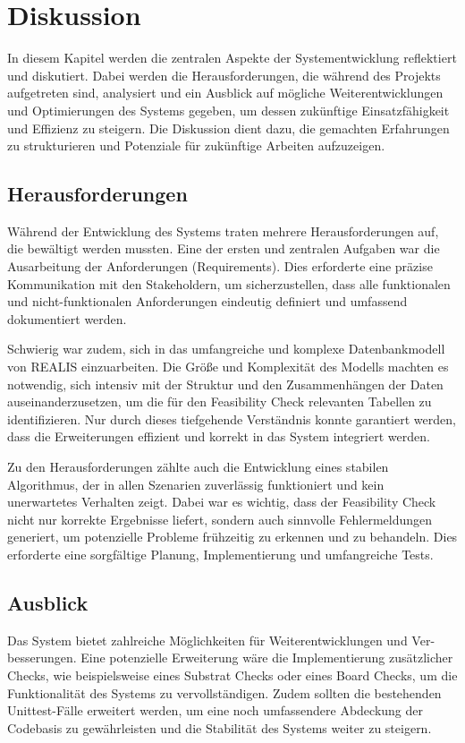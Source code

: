 \chapter{Diskussion}
In diesem Kapitel werden die zentralen Aspekte der Systementwicklung reflektiert und diskutiert. Dabei werden die Herausforderungen, die während des Projekts aufgetreten sind, analysiert und ein Ausblick auf mögliche Weiterentwicklungen und Optimierungen des Systems gegeben, um dessen zukünftige Einsatzfähigkeit und Effizienz zu steigern. Die Diskussion dient dazu, die gemachten Erfahrungen zu strukturieren und Potenziale für zukünftige Arbeiten aufzuzeigen.
\section{Herausforderungen}

Während der Entwicklung des Systems traten mehrere Herausforderungen auf, die bewältigt werden mussten. Eine der ersten und zentralen Aufgaben war die Ausarbeitung der Anforderungen (Requirements). Dies erforderte eine präzise Kommunikation mit den Stakeholdern, um sicherzustellen, dass alle funktionalen und nicht-funktionalen Anforderungen eindeutig definiert und umfassend dokumentiert werden. 

Schwierig war zudem, sich in das umfangreiche und komplexe Datenbankmodell von \gls{REALIS} einzuarbeiten. Die Größe und Komplexität des Modells machten es notwendig, sich intensiv mit der Struktur und den Zusammenhängen der Daten auseinanderzusetzen, um die für den Feasibility Check relevanten Tabellen zu identifizieren. Nur durch dieses tiefgehende Verständnis konnte garantiert werden, dass die Erweiterungen effizient und korrekt in das System integriert werden.

Zu den Herausforderungen zählte auch die Entwicklung eines stabilen Algorithmus, der in allen Szenarien zuverlässig funktioniert und kein unerwartetes Verhalten zeigt. Dabei war es wichtig, dass der Feasibility Check nicht nur korrekte Ergebnisse liefert, sondern auch sinnvolle Fehlermeldungen generiert, um potenzielle Probleme frühzeitig zu erkennen und zu behandeln. Dies erforderte eine sorgfältige Planung, Implementierung und umfangreiche Tests.

\section{Ausblick}

Das System bietet zahlreiche Möglichkeiten für Weiterentwicklungen und Ver-\linebreak besserungen. Eine potenzielle Erweiterung wäre die Implementierung zusätzlicher Checks, wie beispielsweise eines Substrat Checks oder eines Board Checks, um die Funktionalität des Systems zu vervollständigen. Zudem sollten die bestehenden Unittest-Fälle erweitert werden, um eine noch umfassendere Abdeckung der Codebasis zu gewährleisten und die Stabilität des Systems weiter zu steigern.

